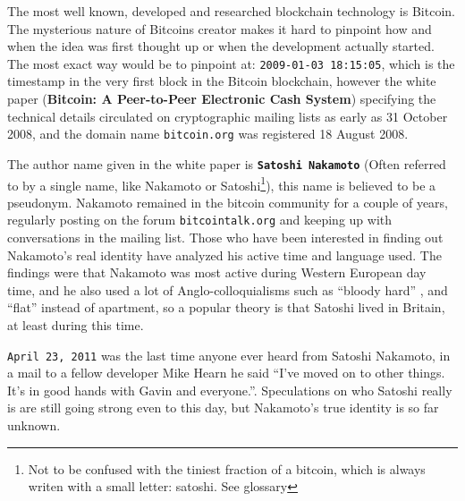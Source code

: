 The most well known, developed and researched blockchain technology is Bitcoin.
The mysterious nature of Bitcoins creator makes it hard to pinpoint how
and when the idea was first thought up or when the development actually started. The
most exact way would be to pinpoint at:
\texttt{2009-01-03 18:15:05}, which is the timestamp in the very
first block in the Bitcoin blockchain, however the white paper (\textbf{Bitcoin:
A Peer-to-Peer Electronic Cash System})\cite{genesis}\cite{nakamoto_bitcoin} specifying the
technical details circulated on cryptographic mailing lists as early as 31
October 2008, and the domain name \texttt{bitcoin.org} was registered 18 August
2008.\cite{bernard_2018}


The author name given in the white paper is 
\textbf{\texttt{Satoshi Nakamoto}} (Often referred to by a single name, like Nakamoto or Satoshi\footnote{Not to be confused with the tiniest fraction of a bitcoin, which is always writen with a small letter: satoshi. See glossary}),
this name is believed to be a pseudonym. Nakamoto remained in the bitcoin
community for a couple of years, regularly posting on the forum
\texttt{bitcointalk.org} and keeping up with conversations in the mailing list.
Those who have been interested in finding out Nakamoto's real identity have
analyzed his active time and language used. The findings were that Nakamoto was
most active during Western European day time, and he also used a lot of
Anglo-colloquialisms such as \enquote{bloody hard} \cite{nakamoto_bloody}, and
\enquote{flat} instead of apartment, so a popular theory is that Satoshi lived in
Britain, at least during this time.\cite{bernard_2018}

\texttt{April 23, 2011} was the last time anyone ever heard from Satoshi
Nakamoto, in a mail to a fellow developer Mike Hearn he said \enquote{I've 
	moved on to other things.  It's in good hands with Gavin and everyone.}.\cite{nakamoto_last_mail}
Speculations on who Satoshi really is are still going strong even to this day, but
Nakamoto's true identity is so far unknown.\cite{bernard_2018}\cite{jeffries_2013}
